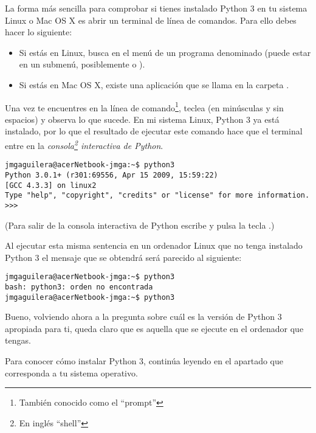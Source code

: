 La forma más sencilla para comprobar si tienes instalado Python 3 en tu sistema Linux o Mac OS X es abrir un terminal de línea de comandos. Para ello debes hacer lo siguiente:

\begin{itemize}
\item Si estás en Linux, busca en el menú de  un programa denominado  (puede estar en un submenú, posiblemente  o ).
\item Si estás en Mac OS X, existe una aplicación que se llama  en la carpeta .
\end{itemize}

Una vez te encuentres en la línea de comando\footnote{También conocido como el ``prompt''}, teclea  (en minúsculas y sin espacios) y observa lo que sucede. En mi sistema Linux, Python 3 ya está instalado, por lo que el resultado de ejecutar este comando hace que el terminal entre en la \emph{consola\footnote{En inglés ``shell''} interactiva de Python}.
\begin{listing}
\begin{verbatim}
jmgaguilera@acerNetbook-jmga:~$ python3
Python 3.0.1+ (r301:69556, Apr 15 2009, 15:59:22) 
[GCC 4.3.3] on linux2
Type "help", "copyright", "credits" or "license" for more information.
>>> 
\end{verbatim}
\end{listing}

(Para salir de la consola interactiva de Python escribe  y pulsa la tecla .)

Al ejecutar esta misma sentencia  en un ordenador Linux que no tenga instalado Python 3 el mensaje que se obtendrá será parecido al siguiente:

\begin{listing}
\begin{verbatim}
jmgaguilera@acerNetbook-jmga:~$ python3
bash: python3: orden no encontrada
jmgaguilera@acerNetbook-jmga:~$ python3
\end{verbatim}
\end{listing}

Bueno, volviendo ahora a la pregunta sobre cuál es la versión de Python 3 apropiada para ti, queda claro que es aquella que se ejecute en el ordenador que tengas.

Para conocer cómo instalar Python 3, continúa leyendo en el apartado que corresponda a tu sistema operativo.

